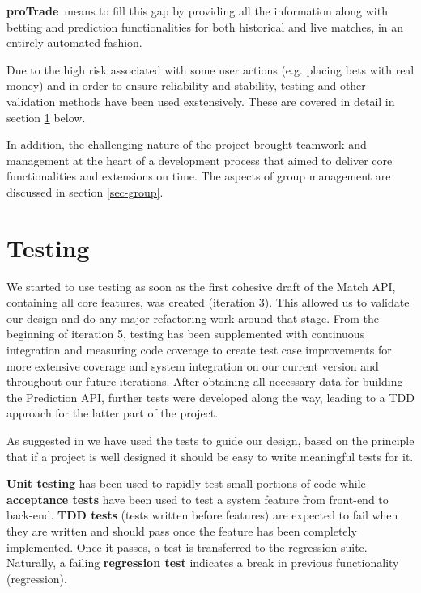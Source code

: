 \documentclass[10pt]{article}
\newcommand{\nm}{{\bf proTrade}}
\newcommand{\nmsp}{{\nm \ }}
\begin{document}
\nmsp means to fill this gap by providing all the information along with betting and prediction functionalities for both historical and live matches, in an entirely automated fashion.

Due to the high risk associated with some user actions (e.g. placing bets with real money) and in order to ensure reliability and stability, testing and other validation methods have been used exstensively. These are covered in detail in section \ref{sec-testing} below.

In addition, the challenging nature of the project brought teamwork and management at the heart of a development process that aimed to deliver core functionalities and extensions on time. The aspects of group management are discussed in section \ref{sec-group}.

\clearpage

\section{Testing}
\label{sec-testing}

We started to use testing as soon as the first cohesive draft of the Match API, containing all core features, was created (iteration 3). This allowed us to validate our design and do any major refactoring work around that stage. From the beginning of iteration 5, testing has been supplemented with continuous integration and measuring code coverage to create test case improvements for more extensive coverage and system integration on our current version and throughout our future iterations. After obtaining all necessary data for building the Prediction API, further tests were developed along the way, leading to a TDD approach for the latter part of the project.

As suggested in \cite{bk-testing} we have used the tests to guide our design, based on the principle that if a project is well designed it should be easy to write meaningful tests for it.

\textbf{Unit testing} has been used to rapidly test small portions of code while \textbf{acceptance tests} have been used to test a system feature from front-end to back-end. \textbf {TDD tests} (tests written before features) are expected to fail when they are written and should pass once the feature has been completely implemented. Once it passes, a test is transferred to the regression suite. Naturally, a failing \textbf{regression test} indicates a break in previous functionality (regression).
\end{document}
